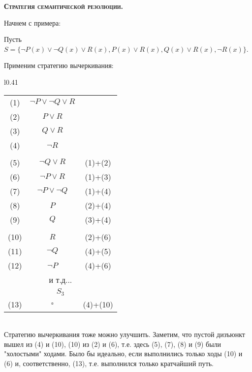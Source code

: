 \documentclass[18pt, a4paper]{extarticle}
\newcommand{\bftex}[1]{\textbf{\textsc{#1}.}}
\begin{document}
\bftex{Стратегия семантической резолюции}

Начнем с примера:

Пусть $S=\{\lnot P(x)\vee\lnot Q(x)\vee R(x),P(x)\vee R(x),Q(x)\vee R(x),\lnot R(x)\}$.

Применим стратегию вычеркивания:

\begin{wrapfigure}[20]{l}{0.41\textwidth}
\begin{tabular}{|c|c|c|}
\hline
\rowcolor[HTML]{34CDF9} 
\multicolumn{3}{|c|}{\cellcolor[HTML]{34CDF9}$S_0$}                       \\ \hline
\cellcolor[HTML]{34CDF9}(1)  & $\lnot P \vee \lnot Q \vee R$ &            \\ \hline
\cellcolor[HTML]{34CDF9}(2)  & $ P \vee R$                   &            \\ \hline
\cellcolor[HTML]{34CDF9}(3)  & $Q \vee R$                    &            \\ \hline
\cellcolor[HTML]{34CDF9}(4)  & $\lnot R$                     &            \\ \hline
\rowcolor[HTML]{34CDF9} 
\multicolumn{3}{|c|}{\cellcolor[HTML]{34CDF9}$S_1$}                       \\ \hline
\cellcolor[HTML]{34CDF9}(5)  & $\lnot Q \vee R$              & (1)+(2)  \\ \hline
\cellcolor[HTML]{34CDF9}(6)  & $\lnot P \vee R$              & (1)+(3)  \\ \hline
\cellcolor[HTML]{34CDF9}(7)  & $\lnot P \vee \lnot Q$        & (1)+(4)  \\ \hline
\cellcolor[HTML]{34CDF9}(8)  & $P$                           & (2)+(4)  \\ \hline
\cellcolor[HTML]{34CDF9}(9)  & $Q$                           & (3)+(4)  \\ \hline
\rowcolor[HTML]{34CDF9} 
\multicolumn{3}{|c|}{\cellcolor[HTML]{34CDF9}$S_2$}                       \\ \hline
\cellcolor[HTML]{34CDF9}(10) & $R$                           & (2)+(6)  \\ \hline
\cellcolor[HTML]{34CDF9}(11) & $\lnot Q$                     & (4)+(5)  \\ \hline
\cellcolor[HTML]{34CDF9}(12) & $\lnot P$                     & (4)+(6)  \\ \hline
\multicolumn{3}{|c|}{и т.д...}                                          \\ \hline
\multicolumn{3}{|c|}{\cellcolor[HTML]{34CDF9}$S_3$}                       \\ \hline
\cellcolor[HTML]{34CDF9}(13) & $\square$                     & (4)+(10) \\ \hline
\end{tabular}
\end{wrapfigure}
\leavevmode\\
Стратегию вычеркивания тоже можно улучшить. Заметим, что пустой дизъюнкт вышел из (4) и (10), (10) из (2) и (6), т.е. здесь (5), (7), (8) и (9) были "холостыми"{} ходами. Было бы идеально, если выполнились только ходы (10) и (6) и, соответственно, (13), т.е. выполнился только кратчайший путь. 
\end{document}
